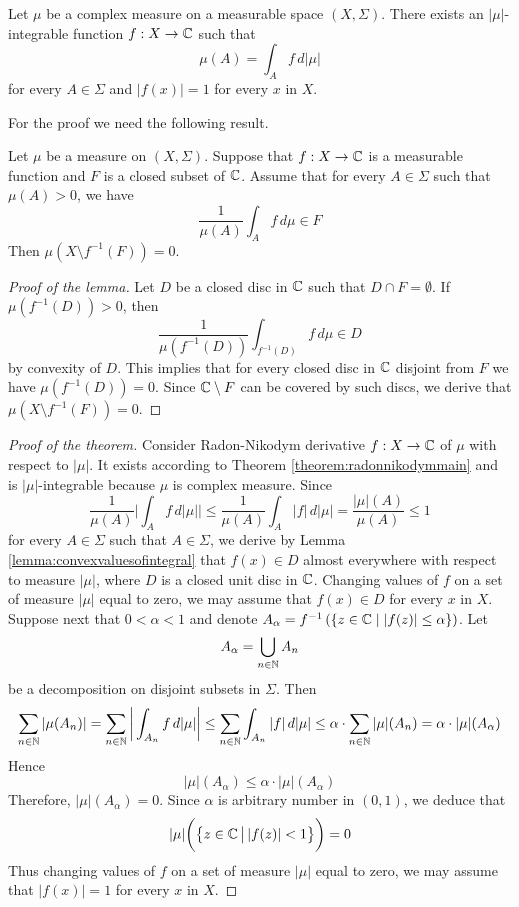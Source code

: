 \begin{theorem}\label{theorem:structureofcomplexmeasures}
    Let $\mu$ be a complex measure on a measurable space $(X,\Sigma)$. There exists an $|\mu|$-integrable function $f:X\rightarrow {\mathbb C}$ such that
    $$\mu(A) = \int_Af\,d|\mu|$$
    for every $A\in \Sigma$ and $|f(x)|=1$ for every $x$ in $X$.
\end{theorem}
\noindent
For the proof we need the following result.
\begin{lemma}\label{lemma:convexvaluesofintegral}
    Let $\mu$ be a measure on $(X,\Sigma)$. Suppose that $f:X\rightarrow {\mathbb C}$ is a measurable function and $F$ is a closed subset of ${\mathbb C}$. Assume that for every $A\in \Sigma$ such that $\mu(A)>0$, we have
    $$\frac{1}{\mu(A)}\int_A f\,d\mu \in F$$
    Then $\mu\left(X\setminus f^{-1}(F)\right)=0$.
\end{lemma}
\begin{proof}[Proof of the lemma]
    Let $D$ be a closed disc in ${\mathbb C}$ such that $D\cap F = \emptyset$. If $\mu\left(f^{-1}(D)\right) > 0$, then
    $$\frac{1}{\mu\left(f^{-1}(D)\right)}\int_{f^{-1}(D)}f\,d\mu \in D$$
    by convexity of $D$. This implies that for every closed disc in ${\mathbb C}$ disjoint from $F$ we have $\mu\left(f^{-1}(D)\right) = 0$. Since ${\mathbb C}\setminus F$ can be covered by such discs, we derive that $\mu\left(X\setminus f^{-1}(F)\right)=0$.
\end{proof}

\begin{proof}[Proof of the theorem]
    Consider Radon-Nikodym derivative $f:X\rightarrow {\mathbb C}$ of $\mu$ with respect to $|\mu|$. It exists according to Theorem \ref{theorem:radonnikodymmain} and is $|\mu|$-integrable because $\mu$ is complex measure. Since
    $$\frac{1}{\mu(A)}\bigg|\int_Af\,d|\mu|\bigg| \leq \frac{1}{\mu(A)}\int_A|f|\,d|\mu| = \frac{|\mu|(A)}{\mu(A)}\leq 1$$
    for every $A\in \Sigma$ such that $A\in \Sigma$, we derive by Lemma \ref{lemma:convexvaluesofintegral} that $f(x)\in D$ almost everywhere with respect to measure $|\mu|$, where $D$ is a closed unit disc in ${\mathbb C}$. Changing values of $f$ on a set of measure $|\mu|$ equal to zero, we may assume that $f(x)\in D$ for every $x$ in $X$.\\
    Suppose next that  $0<\alpha < 1$ and denote $A_{\alpha} = f^{-1}\left(\{z\in {\mathbb C}\mid|f(z)|\leq \alpha \}\right)$. Let
    $$A_{\alpha} = \bigcup_{n\in {\mathbb N}}A_n$$
    be a decomposition on disjoint subsets in $\Sigma$. Then
    $$\sum_{n\in {\mathbb N}}|\mu(A_n)| = \sum_{n\in {\mathbb N}}\bigg|\int_{A_n}f\,d|\mu|\bigg|\leq  \sum_{n\in {\mathbb N}}\int_{A_n}|f|\,d|\mu| \leq \alpha \cdot \sum_{n\in {\mathbb N}} |\mu|(A_n) = \alpha\cdot |\mu|(A_{\alpha})$$
    Hence
    $$|\mu|(A_{\alpha}) \leq \alpha\cdot |\mu|(A_{\alpha})$$
    Therefore, $|\mu|(A_{\alpha})=0$. Since $\alpha$ is arbitrary number in $(0,1)$, we deduce that
    $$|\mu|\bigg(\big\{z\in {\mathbb C}\,\big|\,|f(z)| < 1\big\}\bigg) = 0$$
    Thus changing values of $f$ on a set of measure $|\mu|$ equal to zero, we may assume that $|f(x)|=1$ for every $x$ in $X$.
\end{proof}

